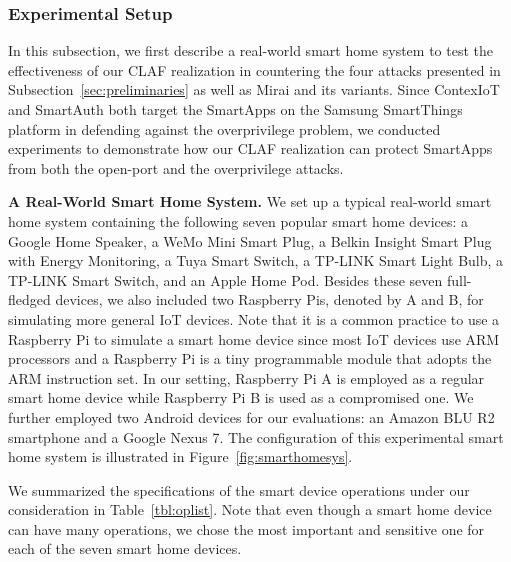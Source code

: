 \documentclass[letterpaper,12pt]{article}
\begin{document}
\subsubsection{Experimental Setup}
In this subsection, we first describe a real-world smart home system to test the effectiveness of our CLAF realization in countering the four attacks presented in Subsection~\ref{sec:preliminaries} as well as Mirai and its variants. Since ContexIoT and SmartAuth both target the SmartApps on the Samsung SmartThings platform in defending against the overprivilege problem, we  conducted experiments to demonstrate how our CLAF realization can protect SmartApps from both the open-port and the overprivilege attacks. 

\textbf{A Real-World Smart Home System.} 
We set up a typical real-world smart home system containing the following seven popular smart home devices: a Google Home Speaker, a WeMo Mini Smart Plug, a Belkin Insight Smart Plug with Energy Monitoring, a Tuya Smart Switch, a TP-LINK Smart Light Bulb, a TP-LINK Smart Switch, and an Apple Home Pod. Besides these seven full-fledged devices, we also included two Raspberry Pis, denoted by A and B, for simulating more general IoT devices. Note that it is a common practice to use a Raspberry Pi to simulate a smart home device since most IoT devices use ARM processors and a Raspberry Pi is a tiny programmable module that adopts the ARM instruction set. In our setting, Raspberry Pi A is employed as a regular smart home device while Raspberry Pi B is used as a compromised one. %
We further employed two Android devices for our evaluations: an Amazon BLU R2 smartphone and a Google Nexus 7. The configuration of this experimental smart home system is illustrated in Figure~\ref{fig:smarthomesys}. 

We summarized the specifications of the smart device operations under our consideration in Table~\ref{tbl:oplist}. Note that even though a smart home device can have many operations, we chose the most important and sensitive one for each of the seven smart home devices.
\end{document}
